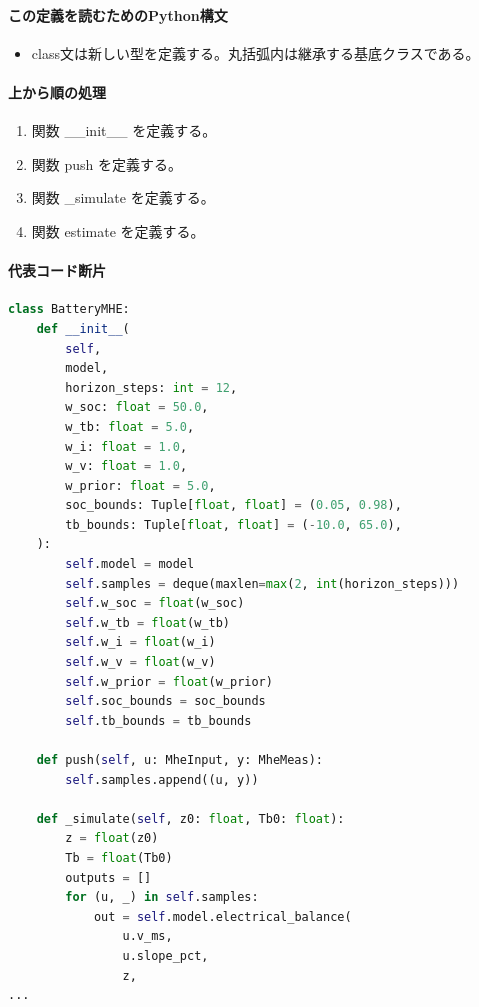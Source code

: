 \documentclass[a4paper,11pt]{article}
\begin{document}
            \paragraph{この定義を読むためのPython構文}
            \begin{itemize}[leftmargin=1.6em]
            \item class文は新しい型を定義する。丸括弧内は継承する基底クラスである。
            \end{itemize}
            \paragraph{上から順の処理}
            \begin{enumerate}[leftmargin=1.8em]
            \item 関数 \_\_init\_\_ を定義する。
\item 関数 push を定義する。
\item 関数 \_simulate を定義する。
\item 関数 estimate を定義する。
            \end{enumerate}
            \paragraph{代表コード断片}
            \begin{lstlisting}[language=Python]
class BatteryMHE:
    def __init__(
        self,
        model,
        horizon_steps: int = 12,
        w_soc: float = 50.0,
        w_tb: float = 5.0,
        w_i: float = 1.0,
        w_v: float = 1.0,
        w_prior: float = 5.0,
        soc_bounds: Tuple[float, float] = (0.05, 0.98),
        tb_bounds: Tuple[float, float] = (-10.0, 65.0),
    ):
        self.model = model
        self.samples = deque(maxlen=max(2, int(horizon_steps)))
        self.w_soc = float(w_soc)
        self.w_tb = float(w_tb)
        self.w_i = float(w_i)
        self.w_v = float(w_v)
        self.w_prior = float(w_prior)
        self.soc_bounds = soc_bounds
        self.tb_bounds = tb_bounds

    def push(self, u: MheInput, y: MheMeas):
        self.samples.append((u, y))

    def _simulate(self, z0: float, Tb0: float):
        z = float(z0)
        Tb = float(Tb0)
        outputs = []
        for (u, _) in self.samples:
            out = self.model.electrical_balance(
                u.v_ms,
                u.slope_pct,
                z,
...
\end{lstlisting}
\end{document}
